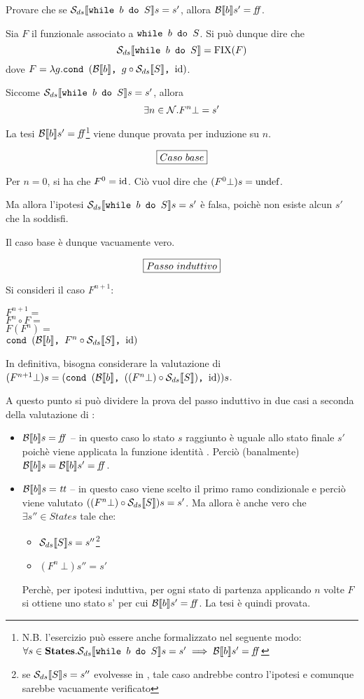 {
  Provare che se $\dsCtxt{\wbS{b}{S}} s = s'$, allora $\B{b}' = \semfalse$.
}
{
}

Sia $F$ il funzionale associato a $\wbS{b}{S}$. Si può dunque dire che
$$
\dsCtxt{\wbS{b}{S}} = \fixp{F}
$$
dove $F = \lambda{g}.\cond{b}{g \circ \dsCtxt{S}}{\idDS}$.

Siccome $\dsCtxt{\wbS{b}{S}} s = s'$, allora
$$
\exists{n}\in\Ncal. F^n \bot = s'
$$

La tesi $\B{b}' = \semfalse$\footnote{N.B. l'esercizio può essere anche
formalizzato nel seguente modo:
$\forall{s\in\states}.\dsCtxt{\wbS{b}{S}} s = s' \implies \B{b}' = \semfalse$} 
viene dunque provata per induzione su $n$.

$$
\boxer{Caso\ base}
$$

Per $n = 0$, si ha che $F^0 = \idDS$. Ciò vuol dire che
$(F^0 \bot) s = \undefDS$.

Ma allora l'ipotesi $\dsCtxt{\wbS{b}{S}} s = s'$ è falsa,
poichè non esiste alcun $s'$ che la soddisfi.

Il caso base è dunque vacuamente vero.

$$
\boxer{Passo\ induttivo}
$$

Si consideri il caso $F^{n+1}$:
\vspace{.5em}

\noindent $F^{n+1} =$ \\
\noindent $F^n \circ F =$ \\
\noindent $F(F^n) =$ \\
\noindent $\cond{b}{F^n \circ \dsCtxt{S}}{\idDS}$
\vspace{.5em}

In definitiva, bisogna considerare la valutazione di
$(F^{n+1} \bot) s = (\cond{b}{((F^n \bot) \circ \dsCtxt{S})}{\idDS}) s$.

A questo punto si può dividere la prova del passo induttivo in due casi a
seconda della valutazione di :
\begin{itemize}
  \item $\B{b} = \semfalse$ -- in questo caso lo stato $s$ raggiunto è uguale
    allo stato finale $s'$ poichè viene applicata la funzione identità \idDS{}.
    Perciò (banalmente) $\B{b} = \B{b}' = \semfalse$.
  \item $\B{b} = \semtrue$ -- in questo caso viene scelto il primo ramo
    condizionale e perciò viene valutato $((F^n \bot) \circ \dsCtxt{S}) s = s'$.
    Ma allora è anche vero che $\exists s'' \in States$ tale che:
    \begin{itemize}
      \item $\dsCtxt{S} s = s''$\footnote{se $\dsCtxt{S} s = s''$ evolvesse in
    \undefDS, tale caso andrebbe contro l'ipotesi e comunque 
    sarebbe vacuamente verificato}
      \item $(F^n\ \bot) s'' = s'$
    \end{itemize}
     Perchè, per ipotesi induttiva, per ogni stato di partenza applicando $n$
   volte $F$ si ottiene uno stato s' per cui $\B{b}' = \semfalse$. La tesi 
   è quindi provata.
\end{itemize}

